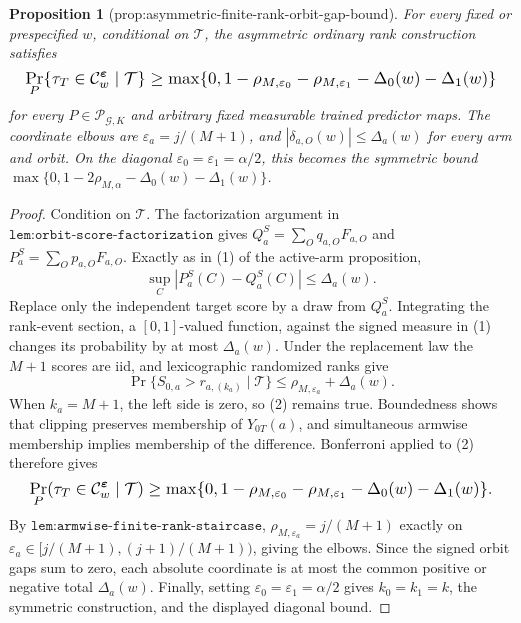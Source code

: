 \documentclass{article}
\newtheorem{proposition}{Proposition}
\begin{document}
\begin{proposition}[prop:asymmetric-finite-rank-orbit-gap-bound]\label{prop:asymmetric-finite-rank-orbit-gap-bound}
For every fixed or prespecified \(w\), conditional on \(\mathcal T\), the asymmetric ordinary rank construction satisfies
\[
\makebox[\linewidth][c]{\resizebox{0.98\linewidth}{!}{\(\displaystyle \Pr_P\!\left\{\tau_T\in\mathcal C^{\boldsymbol\varepsilon}_w\mid\mathcal T\right\}
\ge
\max\!\left\{0,1-\rho_{M,\varepsilon_0}-\rho_{M,\varepsilon_1}-\Delta_0(w)-\Delta_1(w)\right\}\)}}
\]
for every \(P\in\mathcal P_{\mathcal G,K}\) and arbitrary fixed measurable trained predictor maps. The coordinate elbows are \(\varepsilon_a=j/(M+1)\), and \(|\delta_{a,O}(w)|\le\Delta_a(w)\) for every arm and orbit. On the diagonal \(\varepsilon_0=\varepsilon_1=\alpha/2\), this becomes the symmetric bound \(\max\{0,1-2\rho_{M,\alpha}-\Delta_0(w)-\Delta_1(w)\}\).
\end{proposition}
\begin{proof}
Condition on \(\mathcal T\). The factorization argument in \(\texttt{lem:orbit-score-factorization}\) gives \(Q_a^S=\sum_Oq_{a,O}F_{a,O}\) and \(P_a^S=\sum_Op_{a,O}F_{a,O}\). Exactly as in (1) of the active-arm proposition, \[\sup_C|P_a^S(C)-Q_a^S(C)|\le\Delta_a(w).\tag{1}\] Replace only the independent target score by a draw from \(Q_a^S\). Integrating the rank-event section, a \([0,1]\)-valued function, against the signed measure in (1) changes its probability by at most \(\Delta_a(w)\). Under the replacement law the \(M+1\) scores are iid, and lexicographic randomized ranks give \[\Pr\{S_{0,a}>r_{a,(k_a)}\mid\mathcal T\}\le\rho_{M,\varepsilon_a}+\Delta_a(w).\tag{2}\] When \(k_a=M+1\), the left side is zero, so (2) remains true. Boundedness shows that clipping preserves membership of \(Y_{0T}(a)\), and simultaneous armwise membership implies membership of the difference. Bonferroni applied to (2) therefore gives \[
\makebox[\linewidth][c]{\resizebox{0.98\linewidth}{!}{\par\noindent \makebox[\linewidth][c]{\resizebox{0.98\linewidth}{!}{\(\displaystyle \displaystyle \Pr_P(\tau_T\in\mathcal C^{\boldsymbol\varepsilon}_w\mid\mathcal T)\ge\max\{0,1-\rho_{M,\varepsilon_0}-\rho_{M,\varepsilon_1}-\Delta_0(w)-\Delta_1(w)\}.\)}}\par\noindent}}
\] By \(\texttt{lem:armwise-finite-rank-staircase}\), \(\rho_{M,\varepsilon_a}=j/(M+1)\) exactly on \(\varepsilon_a\in[j/(M+1),(j+1)/(M+1))\), giving the elbows. Since the signed orbit gaps sum to zero, each absolute coordinate is at most the common positive or negative total \(\Delta_a(w)\). Finally, setting \(\varepsilon_0=\varepsilon_1=\alpha/2\) gives \(k_0=k_1=k\), the symmetric construction, and the displayed diagonal bound.
\end{proof}
\end{document}
